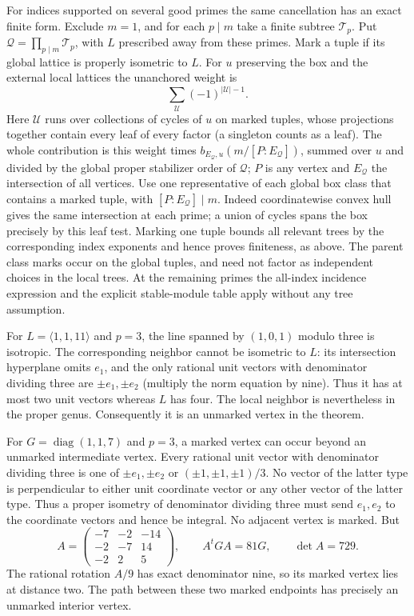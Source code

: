For indices supported on several good primes the same cancellation
has an exact finite form. Exclude $m=1$, and for each $p\mid m$ take a
finite subtree $\mathcal T_p$. Put $\mathcal Q=\prod_{p\mid m}\mathcal T_p$, with $L$ prescribed
away from these primes. Mark a tuple if its global lattice is properly
isometric to $L$. For $u$ preserving the box and the external local
lattices the unanchored weight is
\[
 \sum_{\mathcal U}(-1)^{|\mathcal U|-1}.
\]
Here $\mathcal U$ runs over collections of cycles of $u$ on marked
tuples, whose projections together contain every leaf of every factor
(a singleton counts as a leaf). The whole contribution is this weight
times $b_{E_{\mathcal Q},u}(m/[P:E_{\mathcal Q}])$, summed over $u$ and divided by the
global proper stabilizer order of $\mathcal Q$; $P$ is any vertex and $E_{\mathcal Q}$ the
intersection of all vertices. Use one representative of each global
box class that contains a marked tuple, with $[P:E_{\mathcal Q}]\mid m$.
Indeed coordinatewise convex hull gives the same intersection at
each prime; a union of cycles spans the box precisely by this leaf
test. Marking one tuple bounds all relevant trees by the corresponding
index exponents and hence proves finiteness, as above. The parent
class marks occur on the global tuples, and need not factor as
independent choices in the local trees. At the remaining primes the
all-index incidence expression and the explicit stable-module table
apply without any tree assumption.

For $L=\langle1,1,11\rangle$ and $p=3$, the line spanned by $(1,0,1)$
modulo three is isotropic. The corresponding neighbor cannot be
isometric to $L$: its intersection hyperplane omits $e_1$, and the
only rational unit vectors with denominator dividing three are
$\pm e_1,\pm e_2$ (multiply the norm equation by nine). Thus it
has at most two unit vectors whereas $L$ has four. The local
neighbor is nevertheless in the proper genus. Consequently it is an
unmarked vertex in the theorem.

For $G=\operatorname{diag}(1,1,7)$ and $p=3$, a marked vertex
can occur beyond an unmarked intermediate vertex. Every rational
unit vector with denominator dividing three is one of $\pm e_1,\pm e_2$ or
$(\pm1,\pm1,\pm1)/3$. No vector of the latter type is perpendicular
to either unit coordinate vector or any other vector of the latter
type. Thus a proper isometry of denominator dividing three must send
$e_1,e_2$ to the coordinate vectors and hence be integral. No adjacent
vertex is marked. But
\[
 A=\begin{pmatrix}-7&-2&-14\\-2&-7&14\\-2&2&5\end{pmatrix},
 \qquad A^tGA=81G,\qquad\det A=729 .
\]
The rational rotation $A/9$ has exact denominator nine, so its marked
vertex lies at distance two. The path between these two marked
endpoints has precisely an unmarked interior vertex.
